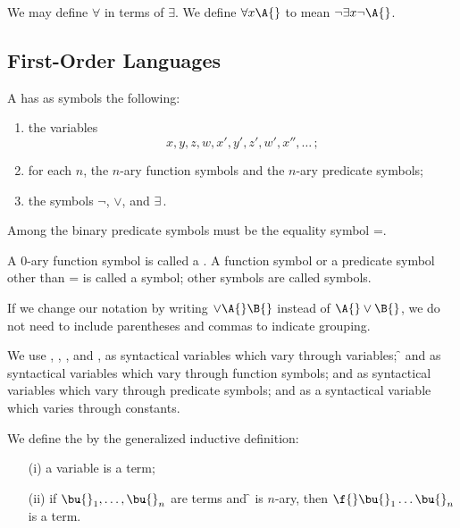 We may define $\forall$ in terms of $\exists$.
We define $\forall x \A{}$ to mean $\neg \exists x \neg \A{}$.


\subsection{First-Order Languages}
\begin{shaded*}
    A  has as symbols the following:
    \begin{enumerate}
        \item the variables
            \begin{equation}
                x,y,z,w,x',y',z',w',x'',\dots\,;
            \end{equation}
        \item for each $n$, the $n$-ary function symbols and the $n$-ary predicate symbols;
        \item the symbols $\neg$, $\vee$, and $\exists$\,.
    \end{enumerate}
\end{shaded*}

Among the binary predicate symbols must be the equality symbol =.

A 0-ary function symbol is called a .
A function symbol or a predicate symbol other than = is called a  symbol;
other symbols are called  symbols.

If we change our notation by writing $\vee \A{}\B{}$ instead of $\A{} \vee \B{}$, we do not need to include parentheses and commas to indicate grouping.

We use \x{}, \y{}, \z{}, and \w{}, as syntactical variables which vary through variables;
\f{} and \g{} as syntactical variables which vary through function symbols;
\p{} and \q{} as syntactical variables which vary through predicate symbols;
and \e{} as a syntactical variable which varies through constants.

We define the  by the generalized inductive definition:
\begin{enumerate}
    \item[(i)] a variable is a term;
    \item[(ii)] if $\bu{}_1, \dots, \bu{}_n$ are terms and \f{} is $n$-ary, then $\f{}\bu{}_1 \dots \bu{}_n$ is a term.
\end{enumerate}

